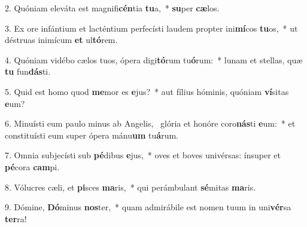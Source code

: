 2. Quóniam eleváta est magnifi\textbf{cén}tia \textbf{tu}a,~*  \textbf{su}per \textbf{cæ}los.\

3. Ex ore infántium et lacténtium perfecísti laudem propter ini\textbf{mí}cos \textbf{tu}os,~*  ut déstruas inimícum \textbf{et} ul\textbf{tó}rem.\

4. Quóniam vidébo cælos tuos, ópera digi\textbf{tó}rum tu\textbf{ó}rum:~*  lunam et stellas, quæ \textbf{tu} fun\textbf{dás}ti.\

5. Quid est homo quod \textbf{me}mor es \textbf{e}jus?~*  aut fílius hóminis, quóniam \textbf{ví}sitas \textbf{e}um?\

6. Minuísti eum paulo minus ab Angelis, \dag\  glória et honóre coro\textbf{nás}ti \textbf{e}um:~*  et constituísti eum super ópera mánu\textbf{um} tu\textbf{á}rum.\

7. Omnia subjecísti sub \textbf{pé}dibus \textbf{e}jus,~*  oves et boves univérsas: ínsuper et \textbf{pé}cora \textbf{cam}pi.\

8. Vólucres cæli, et \textbf{pi}sces \textbf{ma}ris,~*  qui perámbulant \textbf{sé}mitas \textbf{ma}ris.\

9. Dómine, \textbf{Dó}minus \textbf{nos}ter,~*  quam admirábile est nomen tuum in uni\textbf{vér}sa \textbf{ter}ra!\

